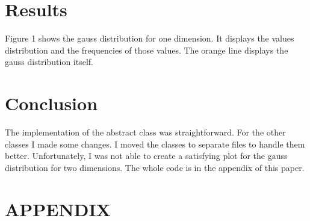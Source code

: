 \documentclass[10pt, a4paper, twocolumn]{article} %
\begin{document}
\section{Results}
Figure 1 shows the gauss distribution for one dimension. It displays the values distribution and the frequencies of those values. The orange line displays the gauss distribution itself.


\section{Conclusion}
The implementation of the abstract class was straightforward. For the other classes I made some changes. I moved the classes to separate files to handle them better. Unfortunately, I was not able to create a satisfying plot for the gauss distribution for two dimensions. The whole code is in the appendix of this paper. 


\printbibliography[title={Bibliography}] %


\section*{APPENDIX}
\end{document}
